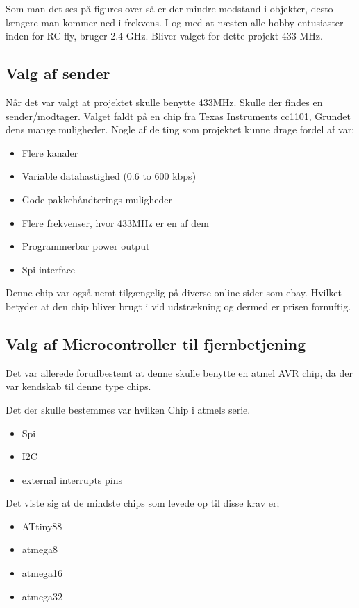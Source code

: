 \documentclass[Main]{subfiles}
\begin{document}
Som man det ses på figures over så er der mindre modstand i objekter, desto længere man kommer ned i frekvens.
I og med at næsten alle hobby entusiaster inden for RC fly, bruger 2.4 GHz. 
Bliver valget for dette projekt 433 MHz.

\subsection{Valg af sender}

Når det var valgt at projektet skulle benytte 433MHz. Skulle der findes en sender/modtager.
Valget faldt på en chip fra Texas Instruments cc1101, Grundet dens mange muligheder.
Nogle af de ting som projektet kunne drage fordel af var;

\begin{itemize}
\item Flere kanaler
\item Variable datahastighed (0.6 to 600 kbps)
\item Gode pakkehåndterings muligheder 
\item Flere frekvenser, hvor 433MHz er en af dem
\item Programmerbar power output
\item Spi interface
\end{itemize}

Denne chip var også nemt tilgængelig på diverse online sider som ebay. Hvilket betyder at den chip bliver brugt i vid udstrækning og dermed er prisen fornuftig.
\\
\subsection{Valg af Microcontroller til fjernbetjening}

Det var allerede forudbestemt at denne skulle benytte en atmel AVR chip, da der var kendskab til denne type chips.

Det der skulle bestemmes var hvilken Chip i atmels serie.

\begin{itemize}
\item Spi
\item I2C
\item external interrupts pins
\end{itemize}

Det viste sig at de mindste chips som levede op til disse krav er;

\begin{itemize}
\item ATtiny88	\cite{AtmelTiny}
\item atmega8	\cite{AtmelMega8}
\item atmega16	\cite{AtmelMega16}
\item atmega32  \cite{AtmelMega32}
\end{itemize}
\end{document}
